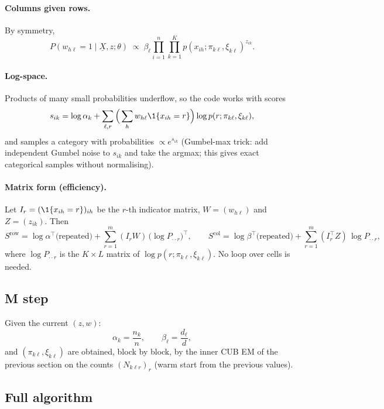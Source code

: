 \paragraph{Columns given rows.} By symmetry,
\[
P(w_{h\ell}=1\mid\underline{X},z;\theta)
\;\propto\;
\beta_\ell\prod_{i=1}^n\prod_{k=1}^K
p(x_{ih};\pi_{k\ell},\xi_{k\ell})^{z_{ik}}.
\]

\paragraph{Log-space.} Products of many small probabilities underflow, so
the code works with scores
\[
s_{ik}=\log\alpha_k+\sum_{\ell,r}\Big(\sum_hw_{h\ell}\1\{x_{ih}=r\}\Big)
\log p(r;\pi_{k\ell},\xi_{k\ell}),
\]
and samples a category with probabilities $\propto e^{s_{ik}}$
(Gumbel-max trick: add independent Gumbel noise to $s_{ik}$ and take the
argmax; this gives exact categorical samples without normalising).

\paragraph{Matrix form (efficiency).}
Let $I_r=(\1\{x_{ih}=r\})_{ih}$ be the $r$-th indicator matrix, $W=(w_{h\ell})$
and $Z=(z_{ik})$. Then
\[
S^{\text{row}}=\log\alpha^\top\text{(repeated)}
+\sum_{r=1}^m(I_rW)\,\big(\log P_{\cdot\cdot r}\big)^\top,
\qquad
S^{\text{col}}=\log\beta^\top\text{(repeated)}
+\sum_{r=1}^m(I_r^\top Z)\,\log P_{\cdot\cdot r},
\]
where $\log P_{\cdot\cdot r}$ is the $K\times L$ matrix of
$\log p(r;\pi_{k\ell},\xi_{k\ell})$. No loop over cells is needed.

\subsection{M step}

Given the current $(z,w)$:
\[
\alpha_k=\frac{n_k}{n},\qquad\beta_\ell=\frac{d_\ell}{d},
\]
and $(\pi_{k\ell},\xi_{k\ell})$ are obtained, block by block, by the inner
CUB EM of the previous section on the counts $(N_{k\ell r})_r$ (warm start
from the previous values).

\subsection{Full algorithm}

